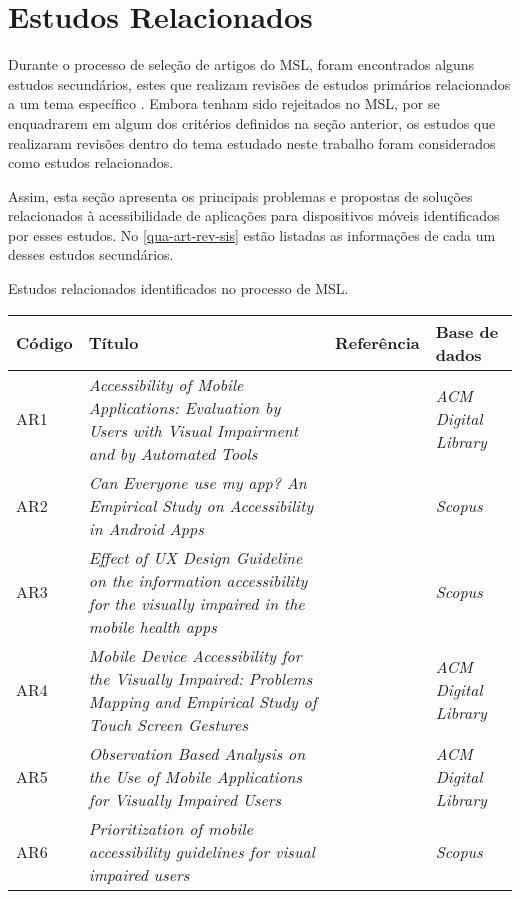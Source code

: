 \section{Estudos Relacionados}

Durante o processo de seleção de artigos do MSL, foram encontrados alguns estudos secundários, estes que realizam revisões de estudos primários
relacionados a um tema específico \cite{Kitchenham2007}. Embora tenham sido rejeitados no MSL, por se enquadrarem em algum dos critérios definidos
na seção anterior, os estudos que realizaram revisões dentro do tema estudado neste trabalho foram considerados como estudos relacionados.

Assim, esta seção apresenta os principais problemas e propostas de soluções relacionados à acessibilidade de aplicações para dispositivos móveis
identificados por esses estudos. No \autoref{qua-art-rev-sis} estão listadas as informações de cada um desses estudos secundários.

\begin{quadro}[htb!]
  \caption{\label{qua-art-rev-sis}Estudos relacionados identificados no processo de MSL.}
  \begin{tabular}{|m{1.2cm} | m{8.1cm} | m{2.7cm} | m{2.5cm}|}
    \hline
    \textbf{Código} & \textbf{Título}                                                                                                             & \textbf{Referência}  & \textbf{Base de dados}     \\
    \hline
    AR1             & \emph{Accessibility of Mobile Applications: Evaluation by Users with Visual Impairment and by Automated Tools}              & \cite{Mateus2020}    & \emph{ACM Digital Library} \\
    \hline
    AR2             & \emph{Can Everyone use my app? An Empirical Study on Accessibility in Android Apps}                                         & \cite{Vendome201941} & \emph{Scopus}              \\
    \hline
    AR3             & \emph{Effect of UX Design Guideline on the information accessibility for the visually impaired in the mobile health apps}   & \cite{Kim20191103}   & \emph{Scopus}              \\
    \hline
    AR4             & \emph{Mobile Device Accessibility for the Visually Impaired: Problems Mapping and Empirical Study of Touch Screen Gestures} & \cite{Damaceno2016}  & \emph{ACM Digital Library} \\
    \hline
    AR5             & \emph{Observation Based Analysis on the Use of Mobile Applications for Visually Impaired Users}                             & \cite{Siebra2016}    & \emph{ACM Digital Library} \\
    \hline
    AR6             & \emph{Prioritization of mobile accessibility guidelines for visual impaired users}                                          & \cite{Quispe2020}    & \emph{Scopus}              \\
    \hline
  \end{tabular}
\end{quadro}

